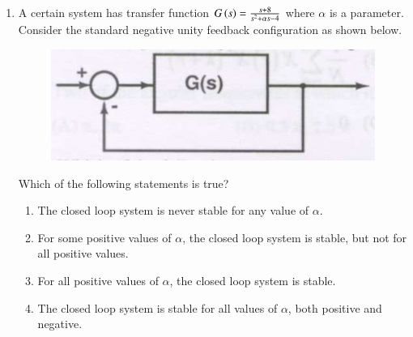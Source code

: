 \documentclass[a4paper, 11pt]{article}
\begin{document}
\begin{enumerate}
    \hfill{}
    
    \item A certain system has transfer function $G\left(s\right) = \frac{s+8}{s^2+\alpha s - 4}$ where $\alpha$ is a parameter. Consider the standard negative unity feedback configuration as shown below.
    \begin{figure}[H]
        \centering
        \includegraphics[width=0.5\columnwidth]{figs/q39.png}
        \caption*{}
        \label{fig:q39}
    \end{figure}
    Which of the following statements is true?
    \begin{enumerate}
        \item The closed loop system is never stable for any value of $\alpha$.
        \item For some positive values of $\alpha$, the closed loop system is stable, but not for all positive values.
        \item For all positive values of $\alpha$, the closed loop system is stable.
        \item The closed loop system is stable for all values of $\alpha$, both positive and negative.
    \end{enumerate}
    
    \hfill{}
    

\end{enumerate}
\end{document}
